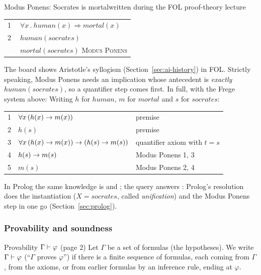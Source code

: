 \begin{nbwhiteboard}[label=wb:modus-ponens]{Modus Ponens: Socrates is mortal}{written during the FOL proof-theory lecture}
\begin{center}
\begin{tabular}{rl}
\textcircled{\scriptsize 1} & $\forall x\,.\ \mathit{human}(x) \Rightarrow \mathit{mortal}(x)$ \\
\textcircled{\scriptsize 2} & $\mathit{human}(\mathit{socrates})$ \\
\hline
 & $\mathit{mortal}(\mathit{socrates})$ \qquad \textsc{Modus Ponens}
\end{tabular}
\end{center}
The board shows Aristotle's syllogism (Section~\ref{sec:ai-history}) in FOL. Strictly
speaking, Modus Ponens needs an implication whose antecedent is \emph{exactly}
$\mathit{human}(\mathit{socrates})$, so a quantifier step comes first. In full, with the
Frege system above:
Writing $h$ for $\mathit{human}$, $m$ for $\mathit{mortal}$ and $s$ for
$\mathit{socrates}$:
\begin{center}
\small
\begin{tabular}{rll}
1 & $\forall x\,(h(x) \rightarrow m(x))$ & premise \\
2 & $h(s)$ & premise \\
3 & $\forall x\,(h(x) \rightarrow m(x)) \rightarrow (h(s) \rightarrow m(s))$ & quantifier axiom with $t = s$ \\
4 & $h(s) \rightarrow m(s)$ & Modus Ponens 1, 3 \\
5 & $m(s)$ & Modus Ponens 2, 4
\end{tabular}
\end{center}
In Prolog the same knowledge is  and ;
the query  answers : Prolog's resolution does the
instantiation ($X = \mathit{socrates}$, called \emph{unification}) and the Modus Ponens
step in one go (Section~\ref{sec:prolog}).
\end{nbwhiteboard}

\subsubsection{Provability and soundness}

\begin{nbdef}{Provability $\Gamma \vdash \varphi$ (page 2)}
Let $\Gamma$ be a set of formulas (the hypotheses). We write $\Gamma \vdash \varphi$
(``$\Gamma$ proves $\varphi$'') if there is a finite sequence of formulas, each coming from
$\Gamma$, from the axioms, or from earlier formulas by an inference rule, ending at
$\varphi$.
\end{nbdef}

